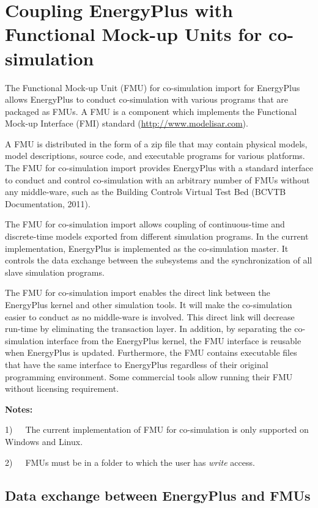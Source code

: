 \section{Coupling EnergyPlus with Functional Mock-up Units for co-simulation}\label{coupling-energyplus-with-functional-mock-up-units-for-co-simulation}

The Functional Mock-up Unit (FMU) for co-simulation import for EnergyPlus allows EnergyPlus to conduct co-simulation with various programs that are packaged as FMUs. A FMU is a component which implements the Functional Mock-up Interface (FMI) standard (\url{http://www.modelisar.com}).

A FMU is distributed in the form of a zip file that may contain physical models, model descriptions, source code, and executable programs for various platforms. The FMU for co-simulation import provides EnergyPlus with a standard interface to conduct and control co-simulation with an arbitrary number of FMUs without any middle-ware, such as the Building Controls Virtual Test Bed (BCVTB Documentation, 2011).

The FMU for co-simulation import allows coupling of continuous-time and discrete-time models exported from different simulation programs. In the current implementation, EnergyPlus is implemented as the co-simulation master. It controls the data exchange between the subsystems and the synchronization of all slave simulation programs.

The FMU for co-simulation import enables the direct link between the EnergyPlus kernel and other simulation tools. It will make the co-simulation easier to conduct as no middle-ware is involved. This direct link will decrease run-time by eliminating the transaction layer. In addition, by separating the co-simulation interface from the EnergyPlus kernel, the FMU interface is reusable when EnergyPlus is updated. Furthermore, the FMU contains executable files that have the same interface to EnergyPlus regardless of their original programming environment. Some commercial tools allow running their FMU without licensing requirement.

\textbf{Notes:}

1)~~~The current implementation of FMU for co-simulation is only supported on Windows and Linux.

2)~~~FMUs must be in a folder to which the user has \emph{write} access.

\subsection{Data exchange between EnergyPlus and FMUs}\label{data-exchange-between-energyplus-and-fmus}

